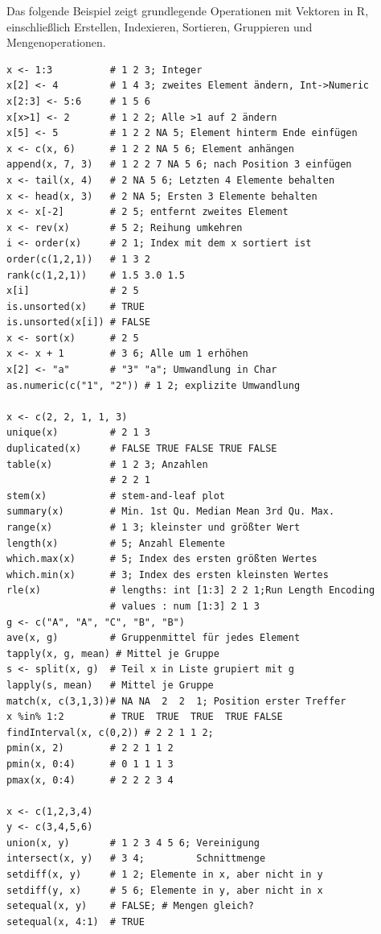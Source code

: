 \documentclass[10pt,twocolumn]{scrartcl}
\begin{document}
Das folgende Beispiel zeigt grundlegende Operationen mit Vektoren in
R, einschließlich Erstellen, Indexieren, Sortieren, Gruppieren und
Mengenoperationen.

\begin{lstlisting}
x <- 1:3          # 1 2 3; Integer
x[2] <- 4         # 1 4 3; zweites Element ändern, Int->Numeric
x[2:3] <- 5:6     # 1 5 6
x[x>1] <- 2       # 1 2 2; Alle >1 auf 2 ändern
x[5] <- 5         # 1 2 2 NA 5; Element hinterm Ende einfügen
x <- c(x, 6)      # 1 2 2 NA 5 6; Element anhängen
append(x, 7, 3)   # 1 2 2 7 NA 5 6; nach Position 3 einfügen
x <- tail(x, 4)   # 2 NA 5 6; Letzten 4 Elemente behalten
x <- head(x, 3)   # 2 NA 5; Ersten 3 Elemente behalten
x <- x[-2]        # 2 5; entfernt zweites Element
x <- rev(x)       # 5 2; Reihung umkehren
i <- order(x)     # 2 1; Index mit dem x sortiert ist
order(c(1,2,1))   # 1 3 2
rank(c(1,2,1))    # 1.5 3.0 1.5
x[i]              # 2 5
is.unsorted(x)    # TRUE
is.unsorted(x[i]) # FALSE
x <- sort(x)      # 2 5
x <- x + 1        # 3 6; Alle um 1 erhöhen
x[2] <- "a"       # "3" "a"; Umwandlung in Char
as.numeric(c("1", "2")) # 1 2; explizite Umwandlung

x <- c(2, 2, 1, 1, 3)
unique(x)         # 2 1 3
duplicated(x)     # FALSE TRUE FALSE TRUE FALSE
table(x)          # 1 2 3; Anzahlen
                  # 2 2 1
stem(x)           # stem-and-leaf plot
summary(x)        # Min. 1st Qu. Median Mean 3rd Qu. Max.
range(x)          # 1 3; kleinster und größter Wert
length(x)         # 5; Anzahl Elemente
which.max(x)      # 5; Index des ersten größten Wertes
which.min(x)      # 3; Index des ersten kleinsten Wertes
rle(x)            # lengths: int [1:3] 2 2 1;Run Length Encoding
                  # values : num [1:3] 2 1 3
g <- c("A", "A", "C", "B", "B")
ave(x, g)         # Gruppenmittel für jedes Element
tapply(x, g, mean) # Mittel je Gruppe
s <- split(x, g)  # Teil x in Liste grupiert mit g
lapply(s, mean)   # Mittel je Gruppe
match(x, c(3,1,3))# NA NA  2  2  1; Position erster Treffer
x %in% 1:2        # TRUE  TRUE  TRUE  TRUE FALSE
findInterval(x, c(0,2)) # 2 2 1 1 2;
pmin(x, 2)        # 2 2 1 1 2
pmin(x, 0:4)      # 0 1 1 1 3
pmax(x, 0:4)      # 2 2 2 3 4

x <- c(1,2,3,4)
y <- c(3,4,5,6)
union(x, y)       # 1 2 3 4 5 6; Vereinigung
intersect(x, y)   # 3 4;         Schnittmenge
setdiff(x, y)     # 1 2; Elemente in x, aber nicht in y
setdiff(y, x)     # 5 6; Elemente in y, aber nicht in x
setequal(x, y)    # FALSE; # Mengen gleich?
setequal(x, 4:1)  # TRUE
\end{lstlisting}
\end{document}
